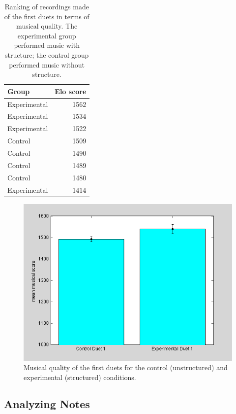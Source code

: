 \documentclass{article}
\begin{document}
\begin{table}[tb]
\begin{center}
\begin{tabular}{l r}
Group & Elo score \\
\hline
Experimental & 1562 \\
Experimental & 1534 \\
Experimental & 1522 \\
Control & 1509 \\
Control & 1490 \\
Control & 1489 \\
Control & 1480 \\
Experimental & 1414 \\
\end{tabular}
\caption{Ranking of recordings made of the first duets in terms of musical quality. The experimental group performed music with structure; the control group performed music without structure.} 
\label{musicmash-results}
\end{center}
\end{table}

\begin{figure}[tb]
\includegraphics[width=\columnwidth]{music-scores-bar-graph.png}
\caption{Musical quality of the first duets for the control (unstructured) and experimental (structured) conditions.} 
\label{survey-results}
\end{figure}


\subsection{Analyzing Notes}
\end{document}
